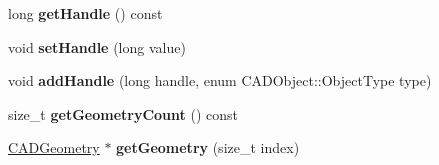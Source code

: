 \begin{DoxyCompactItemize}
\item 
long {\bfseries get\+Handle} () const \hypertarget{class_c_a_d_layer_a722ee842245d3d14260ea5954b374cdc}{}\label{class_c_a_d_layer_a722ee842245d3d14260ea5954b374cdc}

\item 
void {\bfseries set\+Handle} (long value)\hypertarget{class_c_a_d_layer_ad6fa1ac32929cadc4d5775e81891c0fc}{}\label{class_c_a_d_layer_ad6fa1ac32929cadc4d5775e81891c0fc}

\item 
void {\bfseries add\+Handle} (long handle, enum C\+A\+D\+Object\+::\+Object\+Type type)\hypertarget{class_c_a_d_layer_a931ddd3cd28216a52e2bf6c7c7ff6934}{}\label{class_c_a_d_layer_a931ddd3cd28216a52e2bf6c7c7ff6934}

\item 
size\+\_\+t {\bfseries get\+Geometry\+Count} () const \hypertarget{class_c_a_d_layer_acbd810558db7d327af19ba9b8b5eeff2}{}\label{class_c_a_d_layer_acbd810558db7d327af19ba9b8b5eeff2}

\item 
\hyperlink{class_c_a_d_geometry}{C\+A\+D\+Geometry} $\ast$ {\bfseries get\+Geometry} (size\+\_\+t index)\hypertarget{class_c_a_d_layer_a282ac6a605ceac97641c91eab6362df1}{}\label{class_c_a_d_layer_a282ac6a605ceac97641c91eab6362df1}

\end{DoxyCompactItemize}
